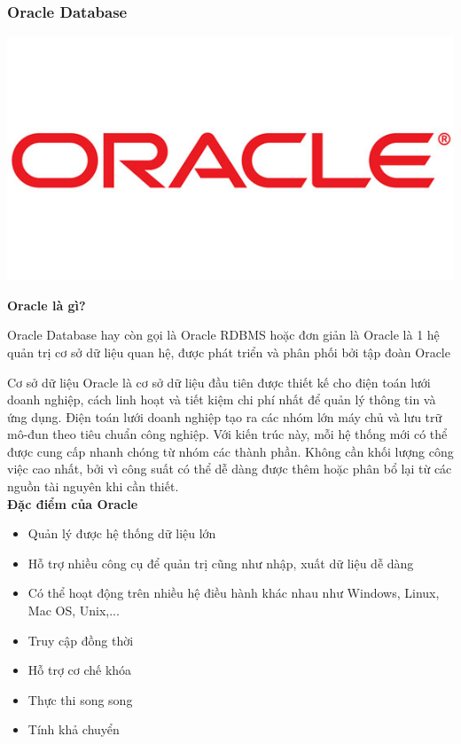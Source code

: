 \subsubsection{Oracle Database}
\begin{center}
  \captionsetup{type=figure}
  \includegraphics[scale=0.4]{img/oracle.jpg}
\end{center}


\textbf{Oracle là gì?}


Oracle Database hay còn gọi là Oracle RDBMS hoặc đơn giản là Oracle là 1 hệ quản trị cơ sở dữ liệu quan hệ, được phát triển và phân phối bởi tập đoàn Oracle

Cơ sở dữ liệu Oracle là cơ sở dữ liệu đầu tiên được thiết kế cho điện toán lưới doanh nghiệp, cách linh hoạt và tiết kiệm chi phí nhất để quản lý thông tin và ứng dụng. Điện toán lưới doanh nghiệp tạo ra các nhóm lớn máy chủ và lưu trữ mô-đun theo tiêu chuẩn công nghiệp. Với kiến trúc này, mỗi hệ thống mới có thể được cung cấp nhanh chóng từ nhóm các thành phần. Không cần khối lượng công việc cao nhất, bởi vì công suất có thể dễ dàng được thêm hoặc phân bổ lại từ các nguồn tài nguyên khi cần thiết.\\

\textbf{Đặc điểm của Oracle}
\begin{itemize}
    \item Quản lý được hệ thống dữ liệu lớn
    \item Hỗ trợ nhiều công cụ để quản trị cũng như nhập, xuất dữ liệu dễ dàng
    \item Có thể hoạt động trên nhiều hệ điều hành khác nhau như Windows, Linux, Mac OS, Unix,...
    \item Truy cập đồng thời
    \item Hỗ trợ cơ chế khóa
    \item Thực thi song song
    \item Tính khả chuyển
\end{itemize}

